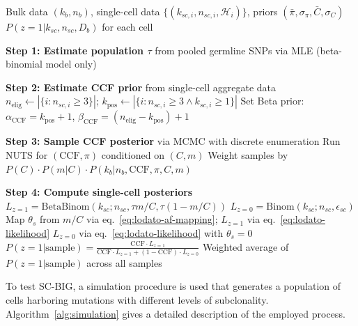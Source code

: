 \documentclass[10pt]{article}
\begin{document}
\begin{algorithm}[htbp]
\caption{Hierarchical Bayesian Inference}
\label{alg:inference}
\begin{algorithmic}[1]
\REQUIRE Bulk data $(k_b, n_b)$, single-cell data $\{(k_{sc,i}, n_{sc,i}, \mathcal{H}_i)\}$, priors $(\bar{\pi}, \sigma_\pi, \bar{C}, \sigma_C)$
\ENSURE $P(z=1 | k_{sc}, n_{sc}, D_b)$ for each cell

\STATE \textbf{Step 1: Estimate population $\tau$} from pooled germline SNPs via MLE (beta-binomial model only)

\STATE \textbf{Step 2: Estimate CCF prior} from single-cell aggregate data
\STATE $n_{\text{elig}} \gets |\{i : n_{sc,i} \geq 3\}|$; \quad $k_{\text{pos}} \gets |\{i : n_{sc,i} \geq 3 \land k_{sc,i} \geq 1\}|$
\STATE Set Beta prior: $\alpha_{\text{CCF}} = k_{\text{pos}} + 1$, $\beta_{\text{CCF}} = (n_{\text{elig}} - k_{\text{pos}}) + 1$

\STATE \textbf{Step 3: Sample CCF posterior} via MCMC with discrete enumeration
    \STATE Run NUTS for $(\text{CCF}, \pi)$ conditioned on $(C, m)$
    \STATE Weight samples by $P(C) \cdot P(m|C) \cdot P(k_b | n_b, \text{CCF}, \pi, C, m)$
\ENDFOR

\STATE \textbf{Step 4: Compute single-cell posteriors}
        \STATE $L_{z=1} = \text{BetaBinom}(k_{sc}; n_{sc}, \tau m/C, \tau(1-m/C))$
        \STATE $L_{z=0} = \text{Binom}(k_{sc}; n_{sc}, \epsilon_{sc})$
        \STATE Map $\theta_s$ from $m/C$ via eq.~\eqref{eq:lodato-af-mapping}; $L_{z=1}$ via eq.~\eqref{eq:lodato-likelihood}
        \STATE $L_{z=0}$ via eq.~\eqref{eq:lodato-likelihood} with $\theta_s = 0$
    \ENDIF
    \STATE $P(z=1|\text{sample}) = \frac{\text{CCF} \cdot L_{z=1}}{\text{CCF} \cdot L_{z=1} + (1-\text{CCF}) \cdot L_{z=0}}$
\ENDFOR
\RETURN Weighted average of $P(z=1|\text{sample})$ across all samples
\end{algorithmic}
\end{algorithm}

To test SC-BIG, a simulation procedure is used that generates a population of cells harboring mutations with different levels of subclonality.
Algorithm~\ref{alg:simulation} gives a detailed description of the employed process.
\end{document}
